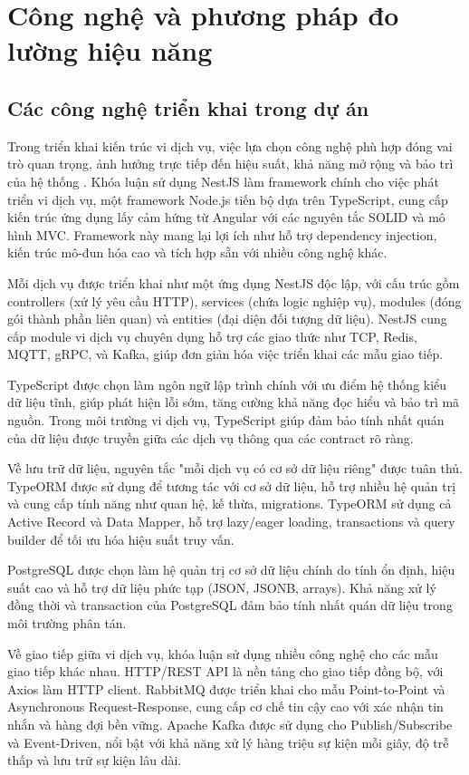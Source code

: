 \section{Công nghệ và phương pháp đo lường hiệu năng}

\subsection{Các công nghệ triển khai trong dự án}
Trong triển khai kiến trúc vi dịch vụ, việc lựa chọn công nghệ phù hợp đóng vai trò quan trọng, ảnh hưởng trực tiếp đến hiệu suất, khả năng mở rộng và bảo trì của hệ thống \cite{newman2015}. Khóa luận sử dụng NestJS làm framework chính cho việc phát triển vi dịch vụ, một framework Node.js tiến bộ dựa trên TypeScript, cung cấp kiến trúc ứng dụng lấy cảm hứng từ Angular với các nguyên tắc SOLID và mô hình MVC. Framework này mang lại lợi ích như hỗ trợ dependency injection, kiến trúc mô-đun hóa cao và tích hợp sẵn với nhiều công nghệ khác.

Mỗi dịch vụ được triển khai như một ứng dụng NestJS độc lập, với cấu trúc gồm controllers (xử lý yêu cầu HTTP), services (chứa logic nghiệp vụ), modules (đóng gói thành phần liên quan) và entities (đại diện đối tượng dữ liệu). NestJS cung cấp module vi dịch vụ chuyên dụng hỗ trợ các giao thức như TCP, Redis, MQTT, gRPC, và Kafka, giúp đơn giản hóa việc triển khai các mẫu giao tiếp.

TypeScript được chọn làm ngôn ngữ lập trình chính với ưu điểm hệ thống kiểu dữ liệu tĩnh, giúp phát hiện lỗi sớm, tăng cường khả năng đọc hiểu và bảo trì mã nguồn. Trong môi trường vi dịch vụ, TypeScript giúp đảm bảo tính nhất quán của dữ liệu được truyền giữa các dịch vụ thông qua các contract rõ ràng.

Về lưu trữ dữ liệu, nguyên tắc "mỗi dịch vụ có cơ sở dữ liệu riêng" được tuân thủ. TypeORM được sử dụng để tương tác với cơ sở dữ liệu, hỗ trợ nhiều hệ quản trị và cung cấp tính năng như quan hệ, kế thừa, migrations. TypeORM sử dụng cả Active Record và Data Mapper, hỗ trợ lazy/eager loading, transactions và query builder để tối ưu hóa hiệu suất truy vấn.

PostgreSQL được chọn làm hệ quản trị cơ sở dữ liệu chính do tính ổn định, hiệu suất cao và hỗ trợ dữ liệu phức tạp (JSON, JSONB, arrays). Khả năng xử lý đồng thời và transaction của PostgreSQL đảm bảo tính nhất quán dữ liệu trong môi trường phân tán.

Về giao tiếp giữa vi dịch vụ, khóa luận sử dụng nhiều công nghệ cho các mẫu giao tiếp khác nhau. HTTP/REST API là nền tảng cho giao tiếp đồng bộ, với Axios làm HTTP client. RabbitMQ được triển khai cho mẫu Point-to-Point và Asynchronous Request-Response, cung cấp cơ chế tin cậy cao với xác nhận tin nhắn và hàng đợi bền vững. Apache Kafka được sử dụng cho Publish/Subscribe và Event-Driven, nổi bật với khả năng xử lý hàng triệu sự kiện mỗi giây, độ trễ thấp và lưu trữ sự kiện lâu dài.

